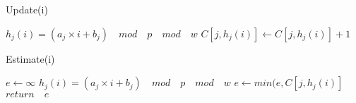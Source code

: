 \begin{algorithm}
\caption{Update(i)}\label{euclid}
\begin{algorithmic}[1]
		\State $h_j(i) = (a_j \times i + b_j) \quad mod \quad p \quad mod \quad w$
		\State $C[j,h_j(i)]  \leftarrow C[j,h_j(i)] + 1$
	\EndFor
\end{algorithmic}
\end{algorithm}



\begin{algorithm}
\caption{Estimate(i)}\label{euclid}
\begin{algorithmic}[1]
	\State $e \gets \infty$
		\State $h_j(i) = (a_j \times i + b_j) \quad mod \quad p \quad mod \quad w$
		\State $e \leftarrow min(e,C[j,h_j(i)]$
	\EndFor
	\State $return \quad e$
\end{algorithmic}
\end{algorithm}




































